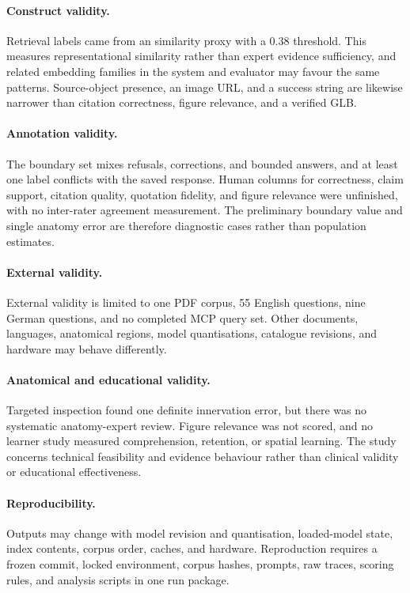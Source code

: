 \paragraph{Construct validity.}
Retrieval labels came from an  similarity proxy with a 0.38 threshold. This measures representational similarity rather than expert evidence sufficiency, and related embedding families in the system and evaluator may favour the same patterns. Source-object presence, an image URL, and a success string are likewise narrower than citation correctness, figure relevance, and a verified GLB.

\paragraph{Annotation validity.}
The boundary set mixes refusals, corrections, and bounded answers, and at least one label conflicts with the saved response. Human columns for correctness, claim support, citation quality, quotation fidelity, and figure relevance were unfinished, with no inter-rater agreement measurement. The preliminary boundary value and single anatomy error are therefore diagnostic cases rather than population estimates.

\paragraph{External validity.}
External validity is limited to one PDF corpus, 55 English questions, nine German questions, and no completed MCP query set. Other documents, languages, anatomical regions, model quantisations, catalogue revisions, and hardware may behave differently.

\paragraph{Anatomical and educational validity.}
Targeted inspection found one definite innervation error, but there was no systematic anatomy-expert review. Figure relevance was not scored, and no learner study measured comprehension, retention, or spatial learning. The study concerns technical feasibility and evidence behaviour rather than clinical validity or educational effectiveness.

\paragraph{Reproducibility.}
Outputs may change with model revision and quantisation, loaded-model state, index contents, corpus order, caches, and hardware. Reproduction requires a frozen commit, locked environment, corpus hashes, prompts, raw traces, scoring rules, and analysis scripts in one run package.

